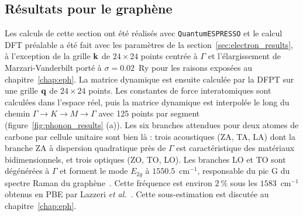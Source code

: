 \subsection{Résultats pour le graphène}\label{sec:phonon_results}

Les calculs de cette section ont été réalisés avec \texttt{QuantumESPRESSO} et le calcul DFT préalable a été fait avec les paramètres de la section~\ref{sec:electron_results}, à l'exception de la grille $\mathbf{k}$ de $24\times 24$ points centrée à $\Gamma$ et l'élargissement de Marzari-Vanderbilt porté à $\sigma=0.02$~Ry pour les raisons exposées au chapitre~\ref{chap:eph}. La matrice dynamique est ensuite calculée par la DFPT sur une grille $\mathbf{q}$ de $24\times 24$ points. Les constantes de force interatomiques sont calculées dans l'espace réel, puis la matrice dynamique est interpolée le long du chemin $\Gamma\to K\to M\to\Gamma$ avec 125 points par segment (figure~\ref{fig:phonon_results} (a)). Les six branches attendues pour deux atomes de carbone par cellule unitaire sont bien là : trois acoustiques (ZA, TA, LA) dont la branche ZA à dispersion quadratique près de $\Gamma$ est caractéristique des matériaux bidimensionnels, et trois optiques (ZO, TO, LO). Les branches LO et TO sont dégénérées à $\Gamma$ et forment le mode $E_{2g}$ à $1550.5$~cm$^{-1}$, responsable du pic G du spectre Raman du graphène~\cite{tuinstraRamanSpectrumGraphite1970}. Cette fréquence est environ $2~\%$ sous les $1583$~cm$^{-1}$ obtenus en PBE par Lazzeri \textit{et al.}~\cite{lazzeriImpactElectronelectronCorrelation2008}. Cette sous-estimation est discutée au chapitre~\ref{chap:eph}.

